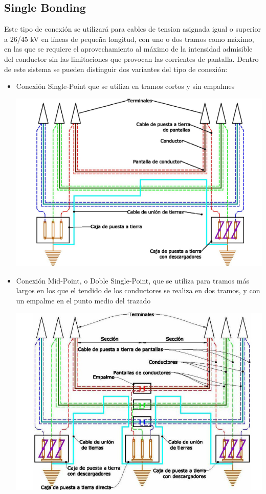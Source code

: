 \documentclass[10pt,a4paper]{article}
\begin{document}
\subsection{Single Bonding}
Este tipo de conexión se utilizará para cables de tension asignada igual o
superior a 26/45 kV en líneas de pequeña longitud, con uno o dos tramos
como máximo, en las que se requiere el aprovechamiento al máximo de la
intensidad admisible del conductor sin las limitaciones que provocan las
corrientes de pantalla.
Dentro de este sistema se pueden distinguir dos variantes del tipo de
conexión:
\begin{itemize}
    \item Conexión Single-Point que se utiliza en tramos cortos y sin empalmes
    \begin{center}
        \includegraphics[scale = 0.6]{SinglePoint.png}
    \end{center}
    \item  Conexión Mid-Point, o Doble Single-Point, que se utiliza para tramos más largos en los que el tendido de los conductores se realiza en dos tramos, y con un empalme en el punto medio del trazado
    \begin{center}
        \includegraphics[scale = 0.6]{MidPoint.png}
    \end{center}
\end{itemize}
\end{document}
